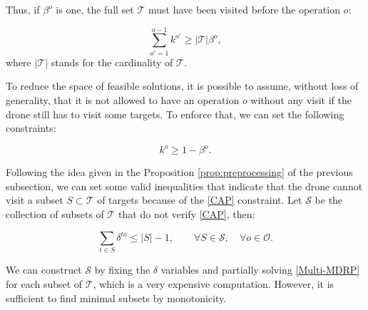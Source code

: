 Thus, if $\beta^o$ is one, the full set $\mathcal T$ must have been visited before the operation $o$:

\begin{equation}\tag{VI-1}\label{eq:VI-1}
\sum_{o'=1}^{o-1} k^{o'} \geq |\mathcal T|\beta^o,
\end{equation}
where $|\mathcal T|$ stands for the cardinality of $\mathcal T$.

To reduce the space of feasible solutions, it is possible to assume, without loss of generality, that it is not allowed to have an operation $o$ without any visit if the drone still has to visit some targets. To enforce that, we can set the following constraints:

\begin{equation}\tag{VI-2}\label{eq:VI-2}
k^o \geq 1 - \beta^o.
\end{equation}

Following the idea given in the Proposition \ref{prop:preprocessing} of the previous subsection, we can set some valid inequalities that indicate that the drone cannot visit a subset $S\subset\mathcal{T}$ of targets because of the \eqref{CAP} constraint. Let $\mathcal S$ be the collection of subsets of $\mathcal T$ that do not verify \eqref{CAP}, then:

\begin{equation}\tag{VI-3}\label{eq:VI-3}
\sum_{t\in S} \delta^{to} \leq |S| - 1, \qquad\forall S\in \mathcal S, \quad\forall o\in\mathcal O.
\end{equation}

We can construct $\mathcal S$ by fixing the $\delta$ variables and partially solving \eqref{Multi-MDRP} for each subset of $\mathcal T$, which is a very expensive computation. However, it is sufficient to find minimal subsets by monotonicity.


